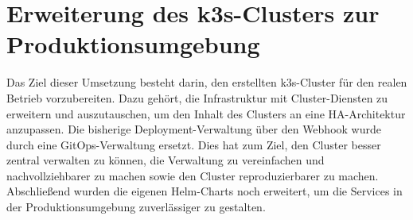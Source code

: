 \section{Erweiterung des k3s-Clusters zur Produktionsumgebung}

Das Ziel dieser Umsetzung besteht darin, den erstellten k3s-Cluster für den realen Betrieb vorzubereiten.
Dazu gehört, die Infrastruktur mit Cluster-Diensten zu erweitern und auszutauschen, um den Inhalt des Clusters an eine HA-Architektur anzupassen.
Die bisherige Deployment-Verwaltung über den Webhook wurde durch eine GitOps-Verwaltung ersetzt. 
Dies hat zum Ziel, den Cluster besser zentral verwalten zu können, die Verwaltung zu vereinfachen und nachvollziehbarer zu machen sowie den Cluster reproduzierbarer zu machen.
Abschließend wurden die eigenen Helm-Charts noch erweitert, um die Services in der Produktionsumgebung zuverlässiger zu gestalten.




